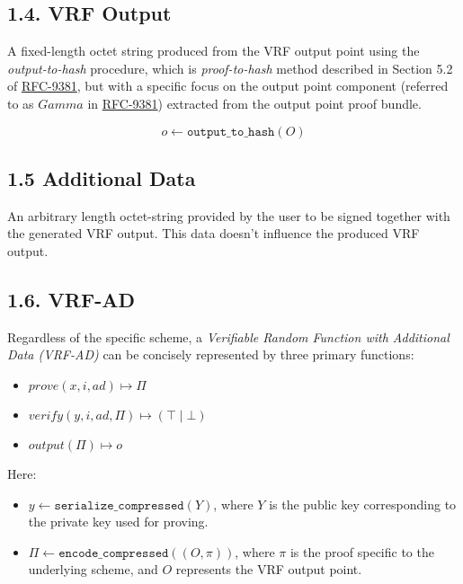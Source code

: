 \documentclass[
]{article}
\providecommand{\tightlist}{%
  \setlength{\itemsep}{0pt}\setlength{\parskip}{0pt}}
\begin{document}
\subsection{1.4. VRF Output}\label{vrf-output}

A fixed-length octet string produced from the VRF output point using the
\emph{output-to-hash} procedure, which is \emph{proof-to-hash} method
described in Section 5.2 of
\href{https://datatracker.ietf.org/doc/rfc9381}{RFC-9381}, but with a
specific focus on the output point component (referred to as \(Gamma\)
in \href{https://datatracker.ietf.org/doc/rfc9381}{RFC-9381}) extracted
from the output point proof bundle.

\[o \gets \texttt{output\_to\_hash}(O)\]

\subsection{1.5 Additional Data}\label{additional-data}

An arbitrary length octet-string provided by the user to be signed
together with the generated VRF output. This data doesn't influence the
produced VRF output.

\subsection{1.6. VRF-AD}\label{vrf-ad}

Regardless of the specific scheme, a \emph{Verifiable Random Function
with Additional Data (VRF-AD)} can be concisely represented by three
primary functions:

\begin{itemize}
\tightlist
\item
  \(prove(x, i, ad) \mapsto \Pi\)
\item
  \(verify(y, i, ad, \Pi) \mapsto (\top \mid \bot)\)
\item
  \(output(\Pi) \mapsto o\)
\end{itemize}

Here:

\begin{itemize}
\tightlist
\item
  \(y \gets \texttt{serialize\_compressed}(Y)\), where \(Y\) is the
  public key corresponding to the private key used for proving.
\item
  \(\Pi \gets \texttt{encode\_compressed}((O, \pi))\), where \(\pi\) is
  the proof specific to the underlying scheme, and \(O\) represents the
  VRF output point.
\end{itemize}
\end{document}
